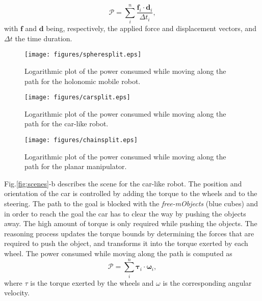 \documentclass[twocolumn]{svjour3}          %
\begin{document}
 \begin{equation}
\label{eq:power}
  \mathcal{P}  =\sum\limits_{i}^n \frac{ \mathbf{f}_i\cdot\mathbf{d}_i}{\Delta t_i},
\end{equation}
with $\mathbf{f}$ and $\mathbf{d}$ being, respectively, the applied force and displacement vectors, and $\Delta t$ the time duration.

\begin{figure*}[t]
\begin{center}
   \texttt{[image: figures/spheresplit.eps]}
   \caption{Logarithmic plot of the power consumed while moving along the path for the holonomic mobile robot.}\label{fig:power1}
\end{center}
\end{figure*}
\begin{figure*}[t]
\begin{center}
   \texttt{[image: figures/carsplit.eps]}
   \caption{Logarithmic plot of the power consumed while moving along the path for the car-like robot.}\label{fig:power2}
\end{center}
\end{figure*}
\begin{figure*}[t]
\begin{center}
   \texttt{[image: figures/chainsplit.eps]}
   \caption{Logarithmic plot of the power consumed while moving along the path for the planar manipulator.}\label{fig:power3}
\end{center}
\end{figure*}
Fig.\ref{fig:scenes}-b describes the scene for the car-like robot. The position and orientation of the car is controlled by adding the torque to the wheels and to the steering. The path to the goal is blocked with the \textit{free-mObjects} (blue cubes) and in order to reach the goal the car has to clear the way by pushing the objects away. The high amount of torque is only required while pushing the objects. The reasoning process updates the torque bounds by determining the forces that are required to push the object, and transforms it into the torque exerted by each wheel. The power consumed while moving along the path is computed as
\begin{equation}
\label{eq:rotpower}
  \mathcal{P}  =\sum\limits_{i}^n \mathbf{\tau}_i\cdot\mathbf{\omega}_i,
\end{equation}
where $\tau$ is the torque exerted by the wheels and $\omega$ is the corresponding angular velocity. 
\end{document}

